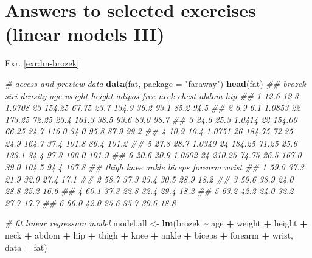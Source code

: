 \documentclass[
]{book}
\newenvironment{Shaded}{\begin{snugshade}}{\end{snugshade}}
\newcommand{\CommentTok}[1]{\textcolor[rgb]{0.56,0.35,0.01}{\textit{#1}}}
\newcommand{\DataTypeTok}[1]{\textcolor[rgb]{0.13,0.29,0.53}{#1}}
\newcommand{\KeywordTok}[1]{\textcolor[rgb]{0.13,0.29,0.53}{\textbf{#1}}}
\newcommand{\NormalTok}[1]{#1}
\newcommand{\OperatorTok}[1]{\textcolor[rgb]{0.81,0.36,0.00}{\textbf{#1}}}
\newcommand{\StringTok}[1]{\textcolor[rgb]{0.31,0.60,0.02}{#1}}
\theoremstyle{definition}
\theoremstyle{definition}
\theoremstyle{definition}
\theoremstyle{remark}
\begin{document}
\hypertarget{answers-to-selected-exercises-linear-models-iii}{%
\section*{Answers to selected exercises (linear models III)}\label{answers-to-selected-exercises-linear-models-iii}}

Exr. \ref{exr:lm-brozek}

\begin{Shaded}
\begin{Highlighting}[]
\CommentTok{\# access and preview data}
\KeywordTok{data}\NormalTok{(fat, }\DataTypeTok{package =} \StringTok{"faraway"}\NormalTok{)}
\KeywordTok{head}\NormalTok{(fat)}
\CommentTok{\#\#   brozek siri density age weight height adipos  free neck chest abdom   hip}
\CommentTok{\#\# 1   12.6 12.3  1.0708  23 154.25  67.75   23.7 134.9 36.2  93.1  85.2  94.5}
\CommentTok{\#\# 2    6.9  6.1  1.0853  22 173.25  72.25   23.4 161.3 38.5  93.6  83.0  98.7}
\CommentTok{\#\# 3   24.6 25.3  1.0414  22 154.00  66.25   24.7 116.0 34.0  95.8  87.9  99.2}
\CommentTok{\#\# 4   10.9 10.4  1.0751  26 184.75  72.25   24.9 164.7 37.4 101.8  86.4 101.2}
\CommentTok{\#\# 5   27.8 28.7  1.0340  24 184.25  71.25   25.6 133.1 34.4  97.3 100.0 101.9}
\CommentTok{\#\# 6   20.6 20.9  1.0502  24 210.25  74.75   26.5 167.0 39.0 104.5  94.4 107.8}
\CommentTok{\#\#   thigh knee ankle biceps forearm wrist}
\CommentTok{\#\# 1  59.0 37.3  21.9   32.0    27.4  17.1}
\CommentTok{\#\# 2  58.7 37.3  23.4   30.5    28.9  18.2}
\CommentTok{\#\# 3  59.6 38.9  24.0   28.8    25.2  16.6}
\CommentTok{\#\# 4  60.1 37.3  22.8   32.4    29.4  18.2}
\CommentTok{\#\# 5  63.2 42.2  24.0   32.2    27.7  17.7}
\CommentTok{\#\# 6  66.0 42.0  25.6   35.7    30.6  18.8}

\CommentTok{\# fit linear regression model}
\NormalTok{model.all \textless{}{-}}\StringTok{ }\KeywordTok{lm}\NormalTok{(brozek }\OperatorTok{\textasciitilde{}}\StringTok{ }\NormalTok{age }\OperatorTok{+}\StringTok{ }\NormalTok{weight }\OperatorTok{+}\StringTok{ }\NormalTok{height }\OperatorTok{+}\StringTok{ }\NormalTok{neck }\OperatorTok{+}\StringTok{ }\NormalTok{abdom }\OperatorTok{+}\StringTok{ }\NormalTok{hip }\OperatorTok{+}\StringTok{ }\NormalTok{thigh }\OperatorTok{+}\StringTok{ }\NormalTok{knee }\OperatorTok{+}\StringTok{ }\NormalTok{ankle }\OperatorTok{+}\StringTok{ }\NormalTok{biceps }\OperatorTok{+}\StringTok{ }\NormalTok{forearm }\OperatorTok{+}\StringTok{ }\NormalTok{wrist, }\DataTypeTok{data =}\NormalTok{ fat)}


\end{Highlighting}
\end{Shaded}
\end{document}
